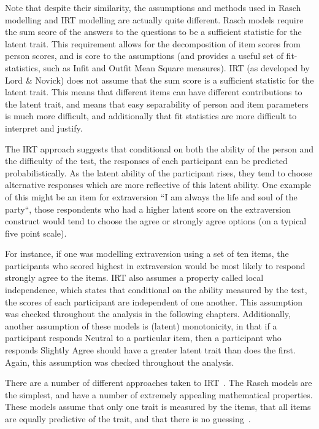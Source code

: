 Note that despite their similarity, the assumptions and methods used in Rasch modelling and IRT modelling are actually quite different. Rasch models require the sum score of the answers to the questions to be a sufficient statistic for the latent trait. This requirement allows for the decomposition of item scores from person scores, and is core to the assumptions (and provides a useful set of fit-statistics, such as Infit and Outfit Mean Square measures). IRT (as developed by Lord \& Novick) does not assume that the sum score is a sufficient statistic for the latent trait. This means that different items can have different contributions to the latent trait, and means that easy separability of person and item parameters is much more difficult, and additionally that fit statistics are more difficult to interpret and justify. 

The IRT approach suggests that conditional on both the ability of the person and the difficulty of the test, the responses of each participant can be predicted probabilistically. As the latent ability of the participant rises, they tend to choose alternative responses which are more reflective of this latent ability. One example of this might be an item for extraversion ``I am always the life and soul of the party``, those respondents who had a higher latent score on the extraversion construct would tend to choose the agree or strongly agree options (on a typical five point scale). 

For instance, if one was modelling extraversion using a set of ten items, the participants who scored highest in extraversion would be most likely to respond strongly agree to the items.  IRT also assumes a property called local independence, which states that conditional on the ability measured by the test, the scores of each participant are independent of one another. This assumption was checked throughout the analysis in the following chapters. Additionally, another assumption of these models is (latent) monotonicity, in that if a participant responds Neutral to a particular item, then a participant who responds Slightly Agree should have a greater latent trait than does the first. Again, this assumption was checked throughout the analysis. 

There are a number of different approaches taken to IRT~\cite{van1997handbook,fischer1995rasch}. The  Rasch models are the simplest, and have a number of extremely appealing mathematical properties. These models assume that only one trait is measured by the items, that all items are equally predictive of the trait, and that there is no guessing~\cite{van1997handbook}.

